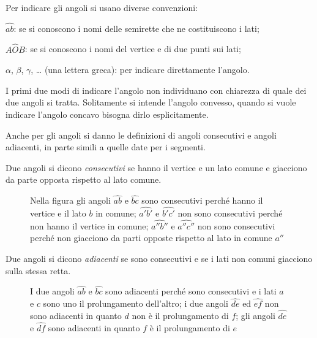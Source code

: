 Per indicare gli angoli si usano diverse convenzioni:
\begin{itemize*}
\item  $\widehat{ab}$: se si conoscono i nomi delle semirette che ne costituiscono i lati;
\item  $A\widehat{O}B$: se si conoscono i nomi del vertice e di due punti sui lati;
\item  $\alpha$, $\beta$, $\gamma$, \ldots{} (una lettera greca): per indicare direttamente l'angolo.
\end{itemize*}
I primi due modi di indicare l'angolo non individuano con chiarezza di quale dei due angoli si tratta. Solitamente si intende l'angolo convesso, quando si vuole indicare l'angolo concavo bisogna dirlo esplicitamente.

Anche per gli angoli si danno le definizioni di angoli consecutivi e angoli adiacenti, in parte simili a quelle date per i segmenti.

\begin{definizione}
Due angoli si dicono \emph{consecutivi} se hanno il vertice e un lato comune e giacciono da parte opposta rispetto al lato comune.
\end{definizione}

\begin{figure}[htb]
 \centering 
\caption{Nella figura gli angoli  $\widehat{ab}$ e $\widehat{bc}$  sono consecutivi perché hanno il vertice e il lato $ b $ in comune;  $\widehat {a'b'}$ e $\widehat {b'c'}$  non sono consecutivi perché non hanno il vertice in comune;  $\widehat {a''b''}$ e $\widehat {a''c''}$ non sono consecutivi perché non giacciono da parti opposte rispetto al lato in comune $a''$}\label{fig:1.22}
\end{figure}

\begin{definizione}
Due angoli si dicono \emph{adiacenti} se sono consecutivi e se i lati non comuni giacciono sulla stessa retta.
\end{definizione}

\begin{figure}[htb]
 \centering 
\caption{I due angoli $\widehat{ab}$ e $\widehat{bc}$ sono adiacenti perché sono consecutivi e i lati $a$ e $c$ sono uno il prolungamento dell'altro; i due angoli $\widehat{de}$ ed $\widehat{ef}$ non sono adiacenti in quanto $d$ non è il prolungamento di $f$; gli angoli $\widehat{de}$ e $\widehat{df}$ sono adiacenti in quanto $f$ è il prolungamento di $e$}\label{fig:1.23}
\end{figure}

